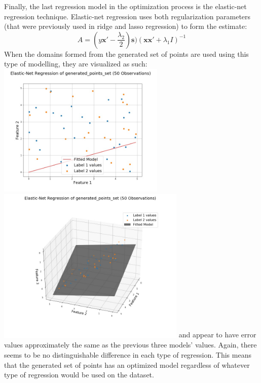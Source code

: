 \documentclass[a4paper,12pt]{IEEEtran}
\begin{document}
Finally, the last regression model in the optimization process is the elastic-net regression technique. Elastic-net regression uses both regularization parameters (that were previously used in ridge and lasso regression) to form the estimate: $$\textit{A} = (\textit{y}\textbf{x}' - \frac{\lambda_{2}}{2})\textbf{s})(\textbf{x}\textbf{x}' +\lambda_{1} \textit{I})^{-1}$$ When the domains formed from the generated set of points are used using this type of modelling, they are visualized as such: \includegraphics[width=8cm]{en_reg_1d_generated_points_set} \includegraphics[width=9cm]{en_reg_2d_generated_points_set} and appear to have error values approximately the same as the previous three models' values. Again, there seems to be no distinguishable difference in each type of regression. This means that the generated set of points has an optimized model regardless of whatever type of regression would be used on the dataset.
\end{document}
